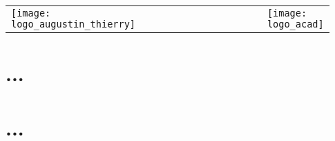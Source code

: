 \documentclass[12pt,oneside]{report}
\newcommand{\classe}{\seuro}
\newcommand{\documenttitle}{...}
\begin{document}

\begin{module}[colback=white]{\classe}
\vspace*{1em}
\begin{tabular}{m{0.15\linewidth}M{0.63\linewidth}R{0.15\linewidth}}
\texttt{[image: logo\_augustin\_thierry]}
&
\textcolor{blue}{\LARGE \bsc{\documenttitle}}
&
\texttt{[image: logo\_acad]}
\end{tabular}
\vspace*{0.2em}
\end{module}

\begin{spacing}{1.2}


\section{...}




\section{...}






\end{spacing}
\end{document}
